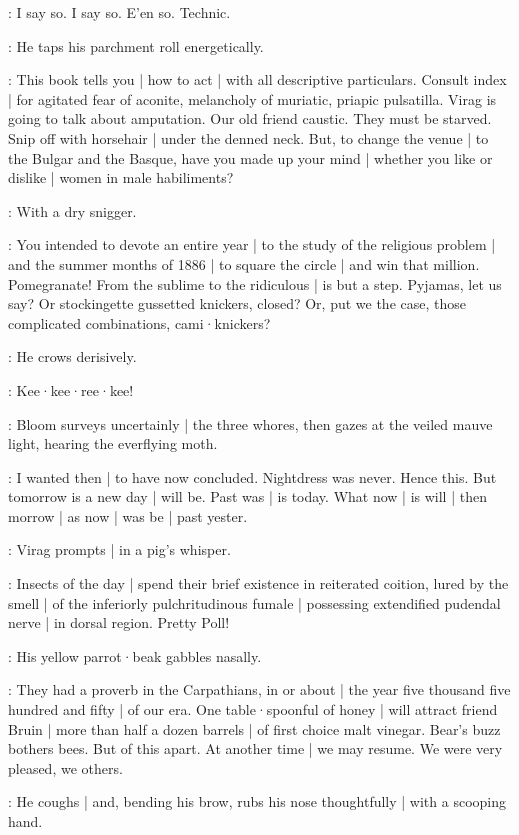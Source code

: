 \Virag:
I say so.
I say so.
E'en so.
Technic.

:
He taps his parchment roll energetically.

\Virag:
This book tells you |
how to act |
with all descriptive particulars.
Consult index |
for agitated fear of aconite,
melancholy of muriatic,
priapic pulsatilla.
Virag is going to talk about amputation.
Our old friend caustic.
They must be starved.
Snip off with horsehair |
under the denned neck.
But,
to change the venue |
to the Bulgar and the Basque,
have you made up your mind |
whether you like or dislike |
women in male habiliments?

:
With a dry snigger.

\Virag:
You intended to devote an entire year |
to the study of the religious problem |
and the summer months of 1886 |
to square the circle |
and win that million.
Pomegranate!
From the sublime to the ridiculous |
is but a step.
Pyjamas,
let us say?
Or stockingette gussetted knickers,
closed?
Or,
put we the case,
those complicated combinations,
cami·knickers?

:
He crows derisively.

\Virag:
Kee·kee·ree·kee!

:
Bloom surveys uncertainly |
the three whores,
then gazes at the veiled mauve light,
hearing the everflying moth.

\Bloom:
I wanted then |
to have now concluded.
Nightdress was never.
Hence this.
But tomorrow is a new day |
will be.
Past was |
is today.
What now |
is will |
then morrow |
as now |
was be |
past yester.

:
Virag prompts |
in a pig's whisper.

\Virag:
Insects of the day |
spend their brief existence in reiterated coition,
lured by the smell |
of the inferiorly pulchritudinous fumale |
possessing extendified pudendal nerve |
in dorsal region.
Pretty Poll!

:
His yellow parrot·beak gabbles nasally.

\Virag:
They had a proverb in the Carpathians,
in or about |
the year five thousand five hundred and fifty |
of our era.
One table·spoonful of honey |
will attract friend Bruin |
more than half a dozen barrels |
of first choice malt vinegar.
Bear's buzz bothers bees.
But of this apart.
At another time |
we may resume.
We were very pleased,
we others.

:
He coughs |
and,
bending his brow,
rubs his nose thoughtfully |
with a scooping hand.

